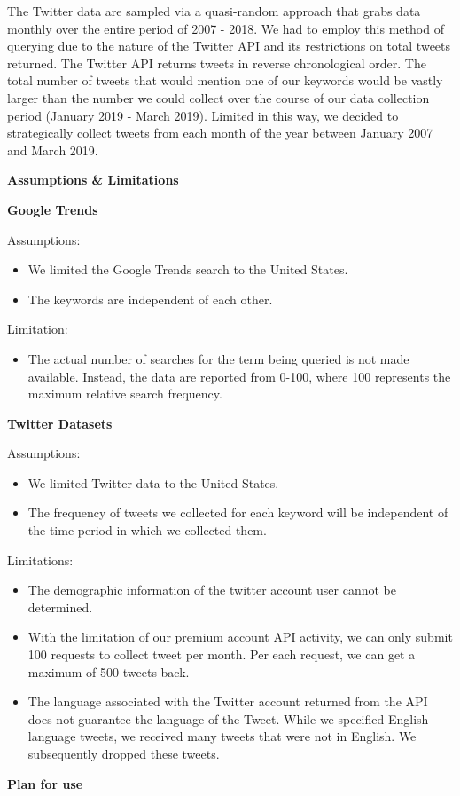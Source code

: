 \documentclass[12pt,oneside]{chicagocapstone}
\providecommand{\tightlist}{%
  \setlength{\itemsep}{0pt}\setlength{\parskip}{0pt}}
\begin{document}
The Twitter data are sampled via a quasi-random approach that grabs data
monthly over the entire period of 2007 - 2018. We had to employ this
method of querying due to the nature of the Twitter API and its
restrictions on total tweets returned. The Twitter API returns tweets in
reverse chronological order. The total number of tweets that would
mention one of our keywords would be vastly larger than the number we
could collect over the course of our data collection period (January
2019 - March 2019). Limited in this way, we decided to strategically
collect tweets from each month of the year between January 2007 and
March 2019.

\textbf{Assumptions \& Limitations}

\textbf{Google Trends}

Assumptions:
\begin{itemize}
\item
  We limited the Google Trends search to the United States.
\item
  The keywords are independent of each other.
\end{itemize}
Limitation:
\begin{itemize}
\tightlist
\item
  The actual number of searches for the term being queried is not made
  available. Instead, the data are reported from 0-100, where 100
  represents the maximum relative search frequency.
\end{itemize}
\textbf{Twitter Datasets}

Assumptions:
\begin{itemize}
\item
  We limited Twitter data to the United States.
\item
  The frequency of tweets we collected for each keyword will be
  independent of the time period in which we collected them.
\end{itemize}
Limitations:
\begin{itemize}
\item
  The demographic information of the twitter account user cannot be
  determined.
\item
  With the limitation of our premium account API activity, we can only
  submit 100 requests to collect tweet per month. Per each request, we
  can get a maximum of 500 tweets back.
\item
  The language associated with the Twitter account returned from the API
  does not guarantee the language of the Tweet. While we specified
  English language tweets, we received many tweets that were not in
  English. We subsequently dropped these tweets.
\end{itemize}
\textbf{Plan for use}
\end{document}
